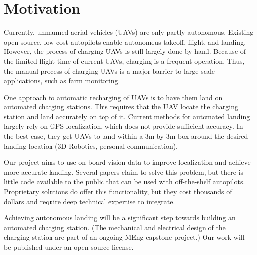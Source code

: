 \section*{Motivation}

Currently, unmanned aerial vehicles (UAVs) are only partly autonomous. Existing
open-source, low-cost autopilots enable autonomous takeoff, flight, and
landing. However, the process of charging UAVs is still largely done by hand.
Because of the limited flight time of current UAVs, charging is a frequent
operation. Thus, the manual process of charging UAVs is a major barrier to
large-scale applications, such as farm monitoring.

One approach to automatic recharging of UAVs is to have them land on automated
charging stations. This requires that the UAV locate the charging station and
land accurately on top of it. Current methods for automated landing largely
rely on GPS localization, which does not provide sufficient accuracy. In the
best case, they get UAVs to land within a 3m by 3m box around the desired
landing location (3D Robotics, personal communication).

Our project aims to use on-board vision data to improve localization and
achieve more accurate landing. Several papers claim to solve this problem, but
there is little code available to the public that can be used with
off-the-shelf autopilots. Proprietary solutions do offer this functionality,
but they cost thousands of dollars and require deep technical expertise to
integrate.

Achieving autonomous landing will be a significant step towards building an
automated charging station. (The mechanical and electrical design of the
charging station are part of an ongoing MEng capstone project.) Our work will
be published under an open-source license.
